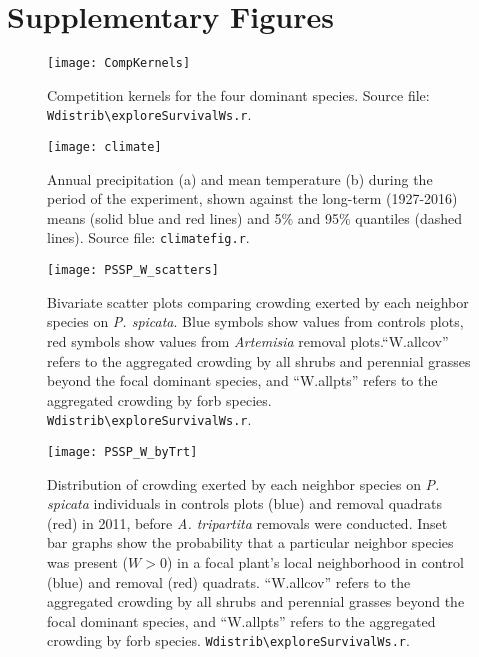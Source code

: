 \documentclass[11pt]{article}
\begin{document}
\section{Supplementary Figures} 

 \begin{figure}[h]
 \centering
 \texttt{[image: CompKernels]}
 \caption{Competition kernels for the four dominant species. Source file: \texttt{Wdistrib\textbackslash exploreSurvivalWs.r}. }
 \label{fig:CompKernels}
 \end{figure}
 
  \begin{figure}[h]
  \centering
  \texttt{[image: climate]}
  \caption{Annual precipitation (a) and mean temperature (b) during the period of the experiment, shown against the long-term (1927-2016) means (solid blue and red lines) and 5\% and 95\% quantiles (dashed lines). Source file:  \texttt{climate\textunderscore fig.r}.}
  \label{fig:climate}
  \end{figure}
  
 
  \begin{figure}[tbp]
  \centering
  \texttt{[image: PSSP\_W\_scatters]}
  \caption{Bivariate scatter plots comparing crowding exerted by each neighbor species on \textit{P. spicata}. Blue symbols show values from controls plots, red symbols show values from \textit{Artemisia} removal plots.``W.allcov'' refers to the aggregated crowding by all shrubs and perennial grasses beyond the focal dominant species, and ``W.allpts'' refers to the aggregated crowding by forb species.  \texttt{Wdistrib\textbackslash exploreSurvivalWs.r}. }
  \label{fig:Wscatters}
  \end{figure}
  
  \begin{figure}[tbp]
 \centering
 \texttt{[image: PSSP\_W\_byTrt]}
 \caption{Distribution of crowding exerted by each neighbor species on \textit{P. spicata} individuals in controls plots (blue) and removal quadrats (red) in 2011, before \textit{A. tripartita}  removals were conducted. Inset bar graphs show the probability that a particular neighbor species was present ($W>0$) in a focal plant's local neighborhood in control (blue) and removal (red) quadrats. ``W.allcov'' refers to the aggregated crowding by all shrubs and perennial grasses beyond the focal dominant species, and ``W.allpts'' refers to the aggregated crowding by forb species.  \texttt{Wdistrib\textbackslash exploreSurvivalWs.r}. }
 \label{fig:W-by-treatment}
 \end{figure}
 
\end{document}

